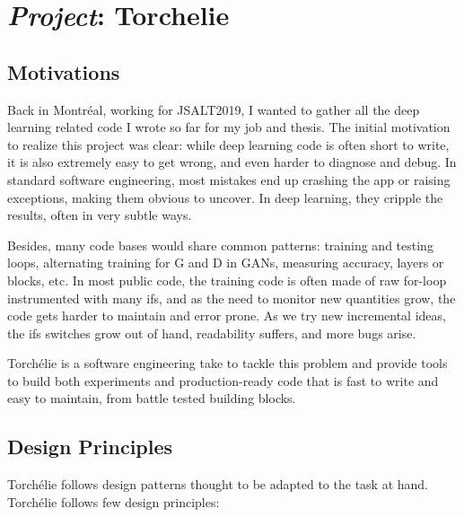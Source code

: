 \chapter{\emph{\arr Project}: Torchelie}

\section{Motivations}

Back in Montréal, working for JSALT2019, I wanted to gather all the deep learning related code I wrote so far for my job and thesis. The initial motivation to realize this project was clear: while deep learning code is often short to write, it is also extremely easy to get wrong, and even harder to diagnose and debug. In standard software engineering, most mistakes end up crashing the app or raising exceptions, making them obvious to uncover. In deep learning, they cripple the results, often in very subtle ways.

Besides, many code bases would share common patterns: training and testing loops, alternating training for G and D in GANs, measuring accuracy, layers or blocks, etc. In most public code, the training code is often made of raw for-loop instrumented with many ifs, and as the need to monitor new quantities grow, the code gets harder to maintain and error prone. As we try new incremental ideas, the ifs switches grow out of hand, readability suffers, and more bugs arise.

Torchélie is a software engineering take to tackle this problem and provide tools to build both experiments and production-ready code that is fast to write and easy to maintain, from battle tested building blocks.

\section{Design Principles}

Torchélie follows design patterns thought to be adapted to the task at hand. Torchélie follows few design principles:

